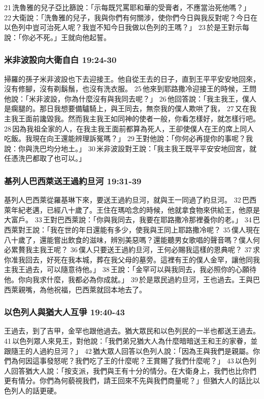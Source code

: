 21 洗魯雅的兒子亞比篩說：「示每既咒罵耶和華的受膏者，不應當治死他嗎？」 22 大衛說：「洗魯雅的兒子，我與你們有何關涉，使你們今日與我反對呢？今日在以色列中豈可治死人呢？我豈不知今日我做以色列的王嗎？」 23 於是王對示每說：「你必不死。」王就向他起誓。

\subsubsection{米非波設向大衛自白 19:24-30}
掃羅的孫子米非波設也下去迎接王。他自從王去的日子，直到王平平安安地回來，沒有修腳，沒有剃鬍鬚，也沒有洗衣服。 25 他來到耶路撒冷迎接王的時候，王問他說：「米非波設，你為什麼沒有與我同去呢？」 26 他回答說：「我主我王，僕人是瘸腿的。那日我想要備驢騎上，與王同去，無奈我的僕人欺哄了我， 27 又在我主我王面前讒毀我。然而我主我王如同神的使者一般，你看怎樣好，就怎樣行吧。 28 因為我祖全家的人，在我主我王面前都算為死人，王卻使僕人在王的席上同人吃飯。我現在向王還能辨理訴冤嗎？」 29 王對他說：「你何必再提你的事呢？我說：你與洗巴均分地土。」 30 米非波設對王說：「我主我王既平平安安地回宮，就任憑洗巴都取了也可以。」

\subsubsection{基列人巴西萊送王過約旦河 19:31-39}
基列人巴西萊從羅基琳下來，要送王過約旦河，就與王一同過了約旦河。 32 巴西萊年紀老邁，已經八十歲了。王住在瑪哈念的時候，他就拿食物來供給王，他原是大富戶。 33 王對巴西萊說：「你與我同去，我要在耶路撒冷那裡養你的老。」 34 巴西萊對王說：「我在世的年日還能有多少，使我與王同上耶路撒冷呢？ 35 僕人現在八十歲了，還能嘗出飲食的滋味，辨別美惡嗎？還能聽男女歌唱的聲音嗎？僕人何必累贅我主我王呢？ 36 僕人只要送王過約旦河，王何必賜我這樣的恩典呢？ 37 求你准我回去，好死在我本城，葬在我父母的墓旁。這裡有王的僕人金罕，讓他同我主我王過去，可以隨意待他。」 38 王說：「金罕可以與我同去，我必照你的心願待他。你向我求什麼，我都必為你成就。」 39 於是眾民過約旦河，王也過去。王與巴西萊親嘴，為他祝福，巴西萊就回本地去了。

\subsubsection{以色列人與猶大人互爭 19:40-43}
王過去，到了吉甲，金罕也跟他過去。猶大眾民和以色列民的一半也都送王過去。 41 以色列眾人來見王，對他說：「我們弟兄猶大人為什麼暗暗送王和王的家眷，並跟隨王的人過約旦河？」 42 猶大眾人回答以色列人說：「因為王與我們是親屬。你們為何因這事發怒呢？我們吃了王的什麼呢？王賞賜了我們什麼呢？」 43 以色列人回答猶大人說：「按支派，我們與王有十分的情分。在大衛身上，我們也比你們更有情分。你們為何藐視我們，請王回來不先與我們商量呢？」但猶大人的話比以色列人的話更硬。

